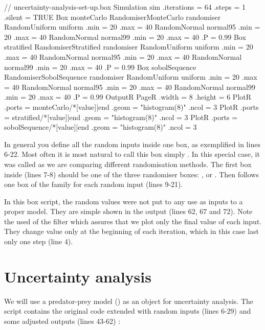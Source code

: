 \lstset{numbers=left}
\begin{boxscript}
// uncertainty-analysis-set-up.box
Simulation sim {
  .iterations = 64
  .steps = 1
  .silent = TRUE
  Box monteCarlo {
    RandomiserMonteCarlo randomiser {
    }
    RandomUniform uniform {
      .min = 20
      .max = 40
    }
    RandomNormal normal95 {
      .min = 20
      .max = 40
    }
    RandomNormal normal99 {
      .min = 20
      .max = 40
      .P = 0.99
    }
  }
  Box stratified {
    RandomiserStratified randomiser {
    }
    RandomUniform uniform {
      .min = 20
      .max = 40
    }
    RandomNormal normal95 {
      .min = 20
      .max = 40
    }
    RandomNormal normal99 {
      .min = 20
      .max = 40
      .P = 0.99
    }
  }
  Box sobolSequence {
    RandomiserSobolSequence randomiser {
    }
    RandomUniform uniform {
      .min = 20
      .max = 40
    }
    RandomNormal normal95 {
      .min = 20
      .max = 40
    }
    RandomNormal normal99 {
      .min = 20
      .max = 40
      .P = 0.99
    }
  }
  OutputR {
    PageR {
      .width = 8
      .height = 6
      PlotR {
        .ports = monteCarlo/*[value]|end
        .geom = "histogram(8)"
        .ncol = 3
      }
      PlotR {
        .ports = stratified/*[value]|end
        .geom = "histogram(8)"
        .ncol = 3
      }
      PlotR {
        .ports = sobolSequence/*[value]|end
        .geom = "histogram(8)"
        .ncol = 3
      }
    }
  }
}
\end{boxscript}
\lstset{numbers=none}

In general you define all the random inputs inside one box, as exemplified in lines 6-22. Most often it is most natural to call this box simply . In this special case, it was called  as we are comparing different randomisation methods. The first box  inside (lines 7-8) should be one of the three randomiser boxes: ,  or . Then follows one box of the  family for each random input (lines 9-21).

In this box script, the random values were not put to any use as inputs to a proper model. They are simple shown in the output (lines 62, 67 and 72). Note the used of the  filter which assures that we plot only the final value of each input. They change value only at the beginning of each iteration, which in this case last only one step (line 4).  

\section{Uncertainty analysis}
We will use a predator-prey model () as an object for uncertainty analysis. The script contains the original code extended with random inputs (lines 6-29) and some adjusted outputs (lines 43-62) :

